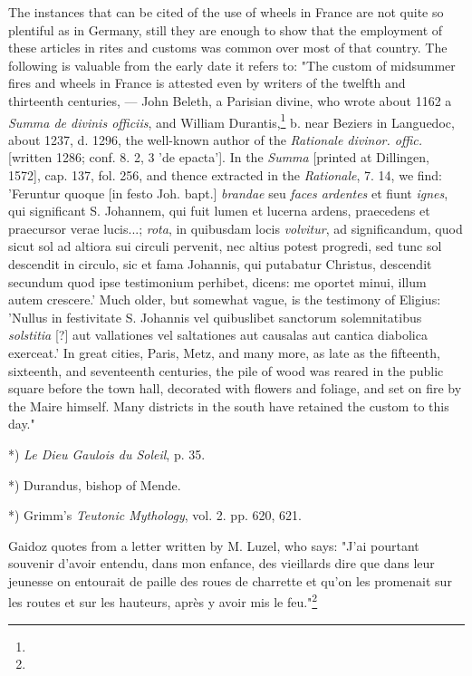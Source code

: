 \documentclass[a4paper, 11pt, oneside, polutonikogreek, english]{article}
\begin{document}
The instances that can be cited of the use of wheels in France are not quite so plentiful as in Germany, still they are enough to show that the employment of these articles in rites and customs was common over most of that country. The following is valuable from the early date it refers to: "The custom of midsummer fires and wheels in France is attested even by writers of the twelfth and thirteenth centuries, --- John Beleth, a Parisian divine, who wrote about 1162 a \emph{Summa de divinis officiis}, and William Durantis,\footnote{} b. near Beziers in Languedoc, about 1237, d. 1296, the well-known author of the \emph{Rationale divinor. offic.} [written 1286; conf. 8. 2, 3 'de epacta']. In the \emph{Summa} [printed at Dillingen, 1572], cap. 137, fol. 256, and thence extracted in the \emph{Rationale}, 7. 14, we find: 'Feruntur quoque [in festo Joh. bapt.] \emph{brandae} seu \emph{faces ardentes} et fiunt \emph{ignes}, qui significant S. Johannem, qui fuit lumen et lucerna ardens, praecedens et praecursor verae lucis...; \emph{rota}, in quibusdam locis \emph{volvitur}, ad significandum, quod sicut sol ad altiora sui circuli pervenit, nec altius potest progredi, sed tunc sol descendit in circulo, sic et fama Johannis, qui putabatur Christus, descendit secundum quod ipse testimonium perhibet, dicens: me oportet minui, illum autem crescere.' Much older, but somewhat vague, is the testimony of Eligius: 'Nullus in festivitate S. Johannis vel quibuslibet sanctorum solemnitatibus \emph{solstitia} [?] aut vallationes vel saltationes aut causalas aut cantica diabolica exerceat.' In great cities, Paris, Metz, and many more, as late as the fifteenth, sixteenth, and seventeenth centuries, the pile of wood was reared in the public square before the town hall, decorated with flowers and foliage, and set on fire by the Maire himself. Many districts in the south have retained the custom to this day."

*) \emph{Le Dieu Gaulois du Soleil}, p. 35.

*) Durandus, bishop of Mende.

*) Grimm's \emph{Teutonic Mythology}, vol. 2. pp. 620, 621.

Gaidoz quotes from a letter written by M. Luzel, who says: "J'ai pourtant souvenir d'avoir entendu, dans mon enfance, des vieillards dire que dans leur jeunesse on entourait de paille des roues de charrette et qu'on les promenait sur les routes et sur les hauteurs, après y avoir mis le feu."\footnote{}
\end{document}
